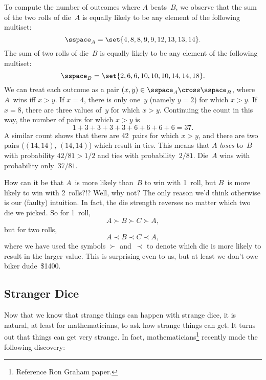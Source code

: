 To compute the number of outcomes where $A$ beats~$B$, we observe that
the sum of the two rolls of die~$A$ is equally likely to be any
element of the following multiset:
\begin{equation*}
    \sspace_A = \set{ 4, 8, 8, 9, 9, 12, 13, 13, 14 }.
\end{equation*}
The sum of two rolls of die~$B$ is equally likely to be any element of
the following multiset:
\begin{equation*}
    \sspace_B = \set{ 2, 6, 6, 10, 10, 10, 14, 14, 18 }.
\end{equation*}
We can treat each outcome as a pair $(x, y) \in \sspace_A
\cross \sspace_B$, where $A$~wins iff $x > y$.  If $x = 4$, there is
only one~$y$ (namely $y = 2$) for which $x > y$.  If $x = 8$, there
are three values of~$y$ for which $x > y$.  Continuing the count in
this way, the number of pairs for which $x > y$ is
\begin{equation*}
    1 + 3 + 3 + 3 + 3 + 6 + 6 + 6 + 6 = 37.
\end{equation*}
A similar count shows that there are 42~pairs for which $x > y$, and
there are two pairs ($(14, 14)$, $(14, 14)$) which result in ties.
This means that $A$ \emph{loses} to~$B$ with probability $42/81 > 1/2$
and ties with probability~$2/81$.  Die~$A$ wins with probability
only~$37/81$.

How can it be that $A$~is more likely than~$B$ to win with 1~roll, but
$B$~is more likely to win with 2~rolls?!?  Well, why not?  The only
reason we'd think otherwise is our (faulty) intuition.  In fact, the
die strength reverses no matter which two die we picked.  So for
1~roll,
\begin{equation*}
    A \succ B \succ C \succ A,
\end{equation*}
but for two rolls,
\begin{equation*}
    A \prec B \prec C \prec A,
\end{equation*}
where we have used the symbols $\succ$ and~$\prec$ to denote which die
is more likely to result in the larger value.  This is surprising even
to us, but at least we don't owe biker dude~\$1400.

\subsection{Stranger Dice}

Now that we know that strange things can happen with strange dice, it
is natural, at least for mathematicians, to ask how strange things can
get.  It turns out that things can get very strange.  In fact,
mathematicians\footnote{Reference Ron Graham paper.} recently made the
following discovery:


